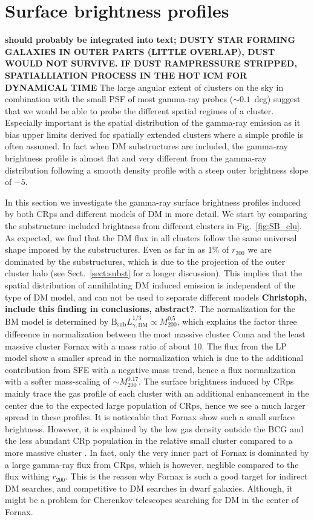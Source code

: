 \documentclass[10pt,aps,pra,reprint,amsmath,amsfonts,amssymb,showpacs,nofootinbib,floatfix]{revtex4-1}
\newcommand{\rmn}{\mathrm}
\newcommand{\B}{\rmn{B}}
\newcommand{\bsub}{\B_\rmn{sub}}
\newcommand{\rvir}{r_{200}}
\newcommand{\mvir}{M_{200}}
\begin{document}
\section{Surface brightness profiles}
\label{sect:spatial}
{\bf should probably be integrated into text; DUSTY STAR FORMING
  GALAXIES IN OUTER PARTS (LITTLE OVERLAP), DUST WOULD NOT SURVIVE. IF
  DUST RAMPRESSURE STRIPPED, SPATIALLIATION PROCESS IN THE HOT ICM FOR
  DYNAMICAL TIME} The large angular extent of clusters on the sky in
combination with the small PSF of most gamma-ray probes ($\sim
0.1$~deg) suggest that we would be able to probe the different spatial
regimes of a cluster. Especially important is the spatial distribution
of the gamma-ray emission as it bias upper limits derived for
spatially extended clusters where a simple profile is often
assumed. In fact when DM substructures are included, the gamma-ray
brightness profile is almost flat and very different from the
gamma-ray distribution following a smooth density profile with a steep
outer brightness slope of $-5$.

In this section we investigate the gamma-ray surface brightness
profiles induced by both CRps and different models of DM in more
detail. We start by comparing the substructure included brightness
from different clusters in Fig.~\ref{fig:SB_clu}. As expected, we find
that the DM flux in all clusters follow the same universal shape
imposed by the substructures. Even as far in as 1\% of $\rvir$ we are
dominated by the substructures, which is due to the projection of the
outer cluster halo (see Sect.~\ref{sect:subst} for a longer
discussion). This implies that the spatial distribution of
annihilating DM induced emission is independent of the type of DM
model, and can not be used to separate different models {\bf
  Christoph, include this finding in conclusions, abstract?}. The
normalization for the BM model is determined by $\bsub
L_{\gamma,\rmn{BM}}^{1/3} \propto \mvir^{0.5}$, which explains the
factor three difference in normalization between the most massive
cluster Coma and the least massive cluster Fornax with a mass ratio of
about 10. The flux from the LP model show a smaller spread in the
normalization which is due to the additional contribution from SFE
with a negative mass trend, hence a flux normalization with a softer
mass-scaling of $\sim\mvir^{0.17}$. The surface brightness induced by
CRps mainly trace the gas profile of each cluster with an additional
enhancement in the center due to the expected large population of
CRps, hence we see a much larger spread in these profiles. It is
noticeable that Fornax show such a small surface brightness. However,
it is explained by the low gas density outside the BCG and the less
abundant CRp population in the relative small cluster compared to a
more massive cluster \cite{2010MNRAS.409..449P}. In fact, only the
very inner part of Fornax is dominated by a large gamma-ray flux from
CRps, which is however, neglible compared to the flux withing
$\rvir$. This is the reason why Fornax is such a good target for
indirect DM searches, and competitive to DM searches in dwarf
galaxies. Although, it might be a problem for Cherenkov telescopes
searching for DM in the center of Fornax.
\end{document}
